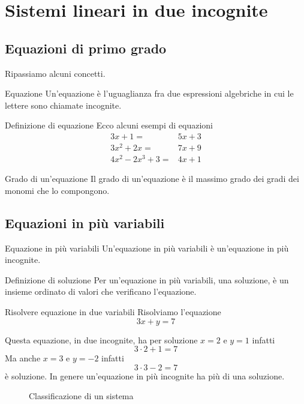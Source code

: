 \chapter{Sistemi lineari in due incognite}
\label{sec:sistemiLineariInDueIncognite}
\section{Equazioni di primo grado}
Ripassiamo alcuni concetti.
\begin{definizionet}{Equazione}{}
	Un'equazione è l'uguaglianza fra due espressioni algebriche in cui le lettere sono chiamate incognite.
\end{definizionet}
\begin{esempiot}{Definizione di equazione}{}
Ecco alcuni esempi di equazioni
\begin{align*}
3x+1=&5x+3\\
3x^2+2x=&7x+9\\
4x^2-2x^3+3=&4x+1
\end{align*}
\end{esempiot}
\begin{definizionet}{Grado di un'equazione}{}
	Il grado di un'equazione è il massimo grado dei gradi dei monomi che lo compongono.
\end{definizionet}
\section{Equazioni in più variabili}
\label{sec:EquazioniInPiuVariabili}
\begin{definizionet}{Equazione in più variabili}{}
	Un'equazione in più variabili è un'equazione in più incognite.
\end{definizionet}
\begin{definizionet}{Definizione di soluzione}{}
Per un'equazione in più variabili, una soluzione, è un insieme ordinato di valori che verificano l'equazione.
\end{definizionet}
\begin{esempiot}{Risolvere equazione in due variabili}{}
	Risolviamo l'equazione\[ 3x+y=7\]
\end{esempiot}	
Questa equazione, in due incognite, ha per soluzione
$x=2$ e $y=1$ infatti \[3\cdot2+1=7\]
Ma anche $x=3$ e $y=-2$ infatti \[3\cdot3-2=7\] è soluzione.
In genere un'equazione in più incognite ha più di una soluzione.
\begin{figure}
	\centering

	\caption{Classificazione di un sistema}
	\label{fig:ClassificazioneDiUnSistema}
\end{figure}

